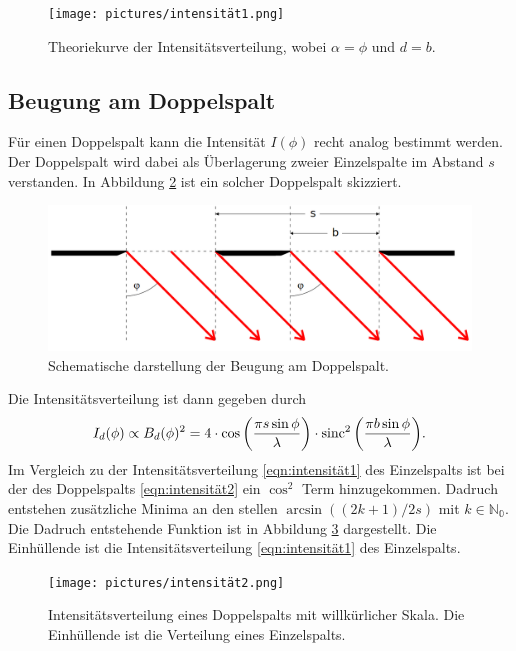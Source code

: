 \begin{figure}[H]
    \centering
    \texttt{[image: pictures/intensität1.png]}
    \caption{Theoriekurve der Intensitätsverteilung, wobei $\alpha=\phi$ und $d=b$. \cite{AP03}}
    \label{fig:frauenhofer2}
\end{figure}

\subsection{Beugung am Doppelspalt}
\label{sec:doppel}
Für einen Doppelspalt kann die Intensität $I(\phi)$ recht analog bestimmt werden. Der Doppelspalt wird dabei als Überlagerung zweier Einzelspalte im 
Abstand $s$ verstanden. In Abbildung \ref{fig:doppel} ist ein solcher Doppelspalt skizziert. 
\begin{figure}[H]
    \centering
    \includegraphics[scale = 0.4]{pictures/doppel.png}
    \caption{Schematische darstellung der Beugung am Doppelspalt. \cite{AP01}}
    \label{fig:doppel}
\end{figure}

\noindent
Die Intensitätsverteilung ist dann gegeben durch
\begin{equation}
    I_d(\phi)\propto B_d(\phi)^2
    =4\cdot \cos{\left(\frac{\pi s\sin{\phi}}{\lambda}\right)}\cdot \operatorname{sinc}^2{\left(\frac{\pi b \sin{\phi}}{\lambda}\right)}  .
    \label{eqn:intensität2}
\end{equation}
Im Vergleich zu der Intensitätsverteilung \eqref{eqn:intensität1} des Einzelspalts ist bei der des Doppelspalts \eqref{eqn:intensität2} ein 
$\cos^2$ Term hinzugekommen. Dadruch entstehen zusätzliche Minima an den stellen $\arcsin{((2k+1)/2s)}$ mit $k\in\mathbb{N_0}$. Die Dadruch 
entstehende Funktion ist in Abbildung \ref{fig:intensität2} dargestellt. Die Einhüllende ist die Intensitätsverteilung \ref{eqn:intensität1}
des Einzelspalts.
\begin{figure}[H]
    \centering
    \texttt{[image: pictures/intensität2.png]}
    \caption{Intensitätsverteilung eines Doppelspalts mit willkürlicher Skala. Die Einhüllende ist die Verteilung eines Einzelspalts. \cite{AP04}}
    \label{fig:intensität2}
\end{figure}

